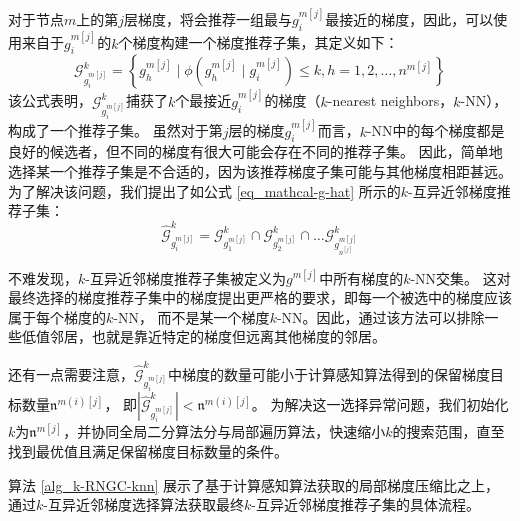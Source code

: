 \documentclass{xdupgthesis}
\begin{document}
对于节点$m$上的第$j$层梯度，将会推荐一组最与$g^{m[j]}_{i}$最接近的梯度，因此，可以使用来自于$g^{m[j]}_{i}$的$k$个梯度构建一个梯度推荐子集，其定义如下：
\begin{equation}
    \mathcal{G}_{g_{i}^{m[j]}}^{k} = \left\{
        g_{h}^{m[j]} \mid \phi\left(
            g^{m[j]}_{h} \mid g^{m[j]}_{i}
        \right) \le k, h = 1, 2, \dots, n^{m[j]}
    \right\}
\end{equation}
该公式表明，$\mathcal{G}_{g_{i}^{m[j]}}^{k}$捕获了$k$个最接近$g_{i}^{m[j]}$的梯度（$k$-nearest neighbors，$k$-NN），构成了一个推荐子集。
虽然对于第$j$层的梯度$g_{i}^{m[j]}$而言，$k$-NN中的每个梯度都是良好的候选者，但不同的梯度有很大可能会存在不同的推荐子集。
因此，简单地选择某一个推荐子集是不合适的，因为该推荐梯度子集可能与其他梯度相距甚远。
为了解决该问题，我们提出了如公式 \eqref{eq_mathcal-g-hat} 所示的$k$-互异近邻梯度推荐子集：
\begin{equation}
    \hat{\mathcal{G}}_{g_{i}^{m[j]}}^{k} = 
        \mathcal{G}_{g_{1}^{m[j]}}^{k} \cap 
        \mathcal{G}_{g_{2}^{m[j]}}^{k} \cap 
        \dots
        \mathcal{G}_{g_{n^{[j]}}^{m[j]}}^{k}
    \label{eq_mathcal-g-hat}
\end{equation}

不难发现，$k$-互异近邻梯度推荐子集被定义为$g^{m[j]}$中所有梯度的$k$-NN交集。
这对最终选择的梯度推荐子集中的梯度提出更严格的要求，即每一个被选中的梯度应该属于每个梯度的$k$-NN，
而不是某一个梯度$k$-NN。因此，通过该方法可以排除一些低值邻居，也就是靠近特定的梯度但远离其他梯度的邻居。

还有一点需要注意，$\hat{\mathcal{G}}_{g_{i}^{m[j]}}^{k}$中梯度的数量可能小于计算感知算法得到的保留梯度目标数量$\mathfrak{n}^{m(i)[j]}$，
即$\left|\hat{\mathcal{G}}_{g_{i}^{m[j]}}^{k}\right| < \mathfrak{n}^{m(i)[j]}$。
为解决这一选择异常问题，我们初始化$k$为$\mathfrak{n}^{m[j]}$，并协同全局二分算法分与局部遍历算法，快速缩小$k$的搜索范围，直至找到最优值且满足保留梯度目标数量的条件。

算法 \ref*{alg_k-RNGC-knn} 展示了基于计算感知算法获取的局部梯度压缩比之上，
通过$k$-互异近邻梯度选择算法获取最终$k$-互异近邻梯度推荐子集的具体流程。
\end{document}
